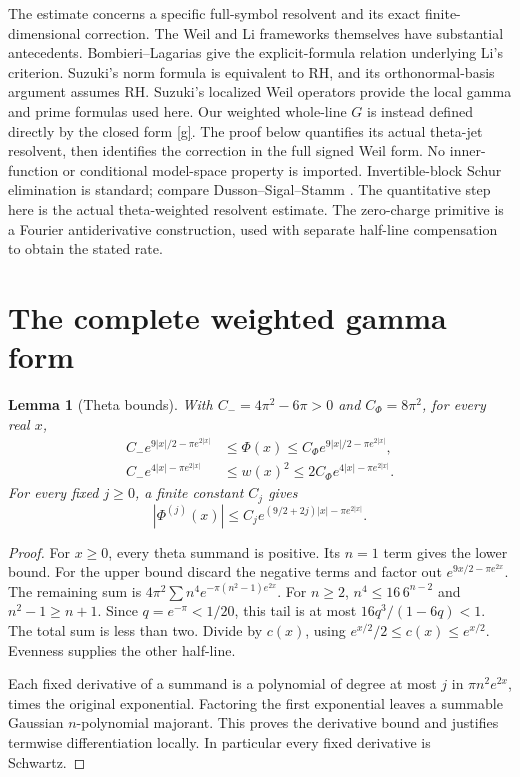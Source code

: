 \documentclass[11pt]{article}
\newtheorem{lemma}[theorem]{Lemma}
\theoremstyle{remark}
\begin{document}
The estimate concerns a specific full-symbol resolvent and its exact
finite-dimensional correction. The Weil and Li frameworks themselves
have substantial antecedents. Bombieri--Lagarias
\cite[Theorem~1 and (2.4); Section~4]{BL} give the explicit-formula
relation underlying Li's criterion. Suzuki's norm formula
\cite[Theorem~1.1, (1.8)]{SuzukiLi} is equivalent to RH, and its
orthonormal-basis argument
\cite[Proposition~3.2]{SuzukiLi} assumes RH. Suzuki's localized
Weil operators \cite[Theorem~1.1; Sections~2.4--2.5]{SuzukiWeil}
provide the local gamma and prime formulas used here. Our weighted
whole-line \(G\) is instead defined directly by the closed form
\eqref{g}. The proof below quantifies its actual theta-jet resolvent,
then identifies the correction in the full signed Weil form.
No inner-function or conditional model-space property is imported.
Invertible-block Schur elimination is standard; compare
Dusson--Sigal--Stamm \cite[Theorem~1.2, (1.10)--(1.11)]{Feshbach}.
The quantitative step here is the actual theta-weighted resolvent
estimate. The zero-charge primitive is a Fourier antiderivative
construction, used with separate half-line compensation to obtain
the stated rate.

\section{The complete weighted gamma form}

\begin{lemma}[Theta bounds]\label{weights}
With \(C_-=4\pi^2-6\pi>0\) and \(C_\Phi=8\pi^2\), for every real \(x\),
\begin{align}
 C_-e^{9|x|/2-\pi e^{2|x|}}
 &\le \Phi(x)\le C_\Phi e^{9|x|/2-\pi e^{2|x|}},\label{phibound}\\
 C_-e^{4|x|-\pi e^{2|x|}}
 &\le w(x)^2\le2C_\Phi e^{4|x|-\pi e^{2|x|}}.\label{wbound}
\end{align}
For every fixed \(j\ge0\), a finite constant \(C_j\) gives
\[
 |\Phi^{(j)}(x)|\le C_j e^{(9/2+2j)|x|-\pi e^{2|x|}}.
\]
\end{lemma}
\begin{proof}
For \(x\ge0\), every theta summand is positive. Its \(n=1\) term
gives the lower bound. For the upper bound discard the negative
terms and factor out \(e^{9x/2-\pi e^{2x}}\).
The remaining sum is
\(4\pi^2\sum n^4e^{-\pi(n^2-1)e^{2x}}\).
For \(n\ge2\), \(n^4\le16\,6^{n-2}\) and \(n^2-1\ge n+1\).
Since \(q=e^{-\pi}<1/20\), this tail is at most
\(16q^3/(1-6q)<1\). The total sum is less than two.
Divide by \(c(x)\), using \(e^{x/2}/2\le c(x)\le e^{x/2}\).
Evenness supplies the other half-line.

Each fixed derivative of a summand is a polynomial of degree at most
\(j\) in \(\pi n^2e^{2x}\), times the original exponential.
Factoring the first exponential leaves a summable Gaussian
\(n\)-polynomial majorant. This proves the derivative bound and
justifies termwise differentiation locally. In particular every
fixed derivative is Schwartz.
\end{proof}
\end{document}
